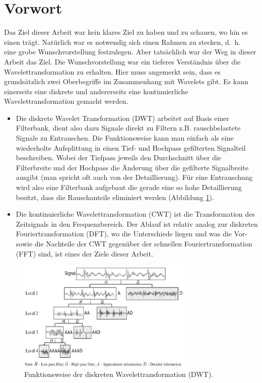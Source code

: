 %
%
%
%
\section{Vorwort\label{wavelets:section:teil0}}
Das Ziel dieser Arbeit war kein klares Ziel zu haben und zu schauen, wo hin es einen trägt. Natürlich war es notwendig sich einen Rahmen zu stecken, d.~h.~ eine grobe Wunschvorstellung festzulegen. Aber tatsächlich war der Weg in dieser Arbeit das Ziel.
Die Wunschvorstellung war ein tieferes Verständnis über die Wavelettransformation zu erhalten. Hier muss angemerkt sein, dass es grundsätzlich zwei Oberbegriffe im Zusammenhang mit Wavelets gibt.
Es kann einerseits eine diskrete und andererseits eine kontinuierliche Wavelettransformation gemacht werden.

\begin{itemize}
	\item   Die diskrete Wavelet Transformation (DWT) arbeitet auf Basis einer Filterbank, dient also dazu Signale direkt zu Filtern z.B. rauschbelastete Signale zu Entrauschen.
	Die Funktionsweise kann man einfach als eine wiederholte Aufsplittung in einen Tief- und Hochpass gefilterten Signalteil beschreiben. Wobei der Tiefpass jeweils den Durchschnitt über die Filterbreite und der Hochpass die Änderung über die gefilterte Signalbreite ausgibt (man spricht oft auch von der Detaillierung). Für eine Entrauschung wird also eine Filterbank aufgebaut die gerade eine so hohe Detaillierung besitzt, dass die Rauschanteile eliminiert werden (Abbildung \ref{wavelet:fig:1_Four-Level-Wavelet-Decomposition}).

 	\item Die kontinuierliche Wavelettransformation (CWT) ist die Transformation des Zeitsignals in den Frequenzbereich. Der Ablauf ist relativ analog zur diskreten Fouriertransformation (DFT), wo die Unterschiede liegen und was die Vor- sowie die Nachteile der CWT gegenüber der schnellen Fouriertransformation (FFT) sind, ist eines der Ziele dieser Arbeit. 
\end{itemize}

\begin{figure}
	\centering
	\includegraphics[width=0.75\textwidth]{papers/wavelets/images/1_Four-Level-Wavelet-Decomposition.png}
	\caption{\cite{wavelets:Haider.2015} Funktionsweise der diskreten Wavelettransformation (DWT).}
	\label{wavelet:fig:1_Four-Level-Wavelet-Decomposition}
\end{figure}

